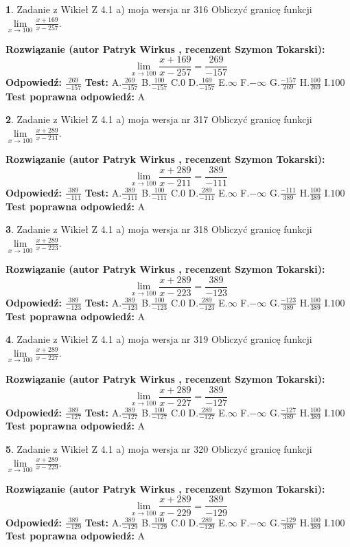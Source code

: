 \documentclass[12pt, a4paper]{article}
\theoremstyle{definition} %
\newtheorem{zad}{}
\newcommand{\zadStart}[1]{\begin{zad}#1\newline}
\newcommand{\zadStop}{\end{zad}}
\newcommand{\rozwStart}[2]{\noindent \textbf{Rozwiązanie (autor #1 , recenzent #2): }\newline}
\newcommand{\rozwStop}{\newline}
\newcommand{\odpStart}{\noindent \textbf{Odpowiedź:}\newline}
\newcommand{\odpStop}{\newline}
\newcommand{\testStart}{\noindent \textbf{Test:}\newline}
\newcommand{\testStop}{\newline}
\newcommand{\kluczStart}{\noindent \textbf{Test poprawna odpowiedź:}\newline}
\newcommand{\kluczStop}{\newline}
\begin{document}
\zadStart{Zadanie z Wikieł Z 4.1 a) moja wersja nr 316}
Obliczyć granicę funkcji $\lim\limits_{x\to100}\frac{x+169}{x-257}$.
\zadStop
\rozwStart{Patryk Wirkus}{Szymon Tokarski}
$$\lim\limits_{x\to100}\frac{x+169}{x-257} = \frac{269}{-157}$$
\rozwStop
\odpStart
$\frac{269}{-157}$
\odpStop
\testStart
A.$\frac{269}{-157}$
B.$\frac{100}{-157}$
C.$0$
D.$\frac{169}{-157}$
E.$\infty$
F.$-\infty$
G.$\frac{-157}{269}$
H.$\frac{100}{269}$
I.$100$
\testStop
\kluczStart
A
\kluczStop



\zadStart{Zadanie z Wikieł Z 4.1 a) moja wersja nr 317}
Obliczyć granicę funkcji $\lim\limits_{x\to100}\frac{x+289}{x-211}$.
\zadStop
\rozwStart{Patryk Wirkus}{Szymon Tokarski}
$$\lim\limits_{x\to100}\frac{x+289}{x-211} = \frac{389}{-111}$$
\rozwStop
\odpStart
$\frac{389}{-111}$
\odpStop
\testStart
A.$\frac{389}{-111}$
B.$\frac{100}{-111}$
C.$0$
D.$\frac{289}{-111}$
E.$\infty$
F.$-\infty$
G.$\frac{-111}{389}$
H.$\frac{100}{389}$
I.$100$
\testStop
\kluczStart
A
\kluczStop



\zadStart{Zadanie z Wikieł Z 4.1 a) moja wersja nr 318}
Obliczyć granicę funkcji $\lim\limits_{x\to100}\frac{x+289}{x-223}$.
\zadStop
\rozwStart{Patryk Wirkus}{Szymon Tokarski}
$$\lim\limits_{x\to100}\frac{x+289}{x-223} = \frac{389}{-123}$$
\rozwStop
\odpStart
$\frac{389}{-123}$
\odpStop
\testStart
A.$\frac{389}{-123}$
B.$\frac{100}{-123}$
C.$0$
D.$\frac{289}{-123}$
E.$\infty$
F.$-\infty$
G.$\frac{-123}{389}$
H.$\frac{100}{389}$
I.$100$
\testStop
\kluczStart
A
\kluczStop



\zadStart{Zadanie z Wikieł Z 4.1 a) moja wersja nr 319}
Obliczyć granicę funkcji $\lim\limits_{x\to100}\frac{x+289}{x-227}$.
\zadStop
\rozwStart{Patryk Wirkus}{Szymon Tokarski}
$$\lim\limits_{x\to100}\frac{x+289}{x-227} = \frac{389}{-127}$$
\rozwStop
\odpStart
$\frac{389}{-127}$
\odpStop
\testStart
A.$\frac{389}{-127}$
B.$\frac{100}{-127}$
C.$0$
D.$\frac{289}{-127}$
E.$\infty$
F.$-\infty$
G.$\frac{-127}{389}$
H.$\frac{100}{389}$
I.$100$
\testStop
\kluczStart
A
\kluczStop



\zadStart{Zadanie z Wikieł Z 4.1 a) moja wersja nr 320}
Obliczyć granicę funkcji $\lim\limits_{x\to100}\frac{x+289}{x-229}$.
\zadStop
\rozwStart{Patryk Wirkus}{Szymon Tokarski}
$$\lim\limits_{x\to100}\frac{x+289}{x-229} = \frac{389}{-129}$$
\rozwStop
\odpStart
$\frac{389}{-129}$
\odpStop
\testStart
A.$\frac{389}{-129}$
B.$\frac{100}{-129}$
C.$0$
D.$\frac{289}{-129}$
E.$\infty$
F.$-\infty$
G.$\frac{-129}{389}$
H.$\frac{100}{389}$
I.$100$
\testStop
\kluczStart
A
\kluczStop
\end{document}
